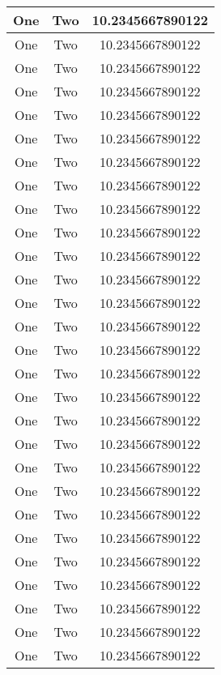 \begin{longtable}{c|c|c}
One & Two & 10.2345667890122 \\ \hline
One & Two & 10.2345667890122 \\ \hline
One & Two & 10.2345667890122 \\ \hline
One & Two & 10.2345667890122 \\ \hline
One & Two & 10.2345667890122 \\ \hline
One & Two & 10.2345667890122 \\ \hline
One & Two & 10.2345667890122 \\ \hline
One & Two & 10.2345667890122 \\ \hline
One & Two & 10.2345667890122 \\ \hline
One & Two & 10.2345667890122 \\ \hline
One & Two & 10.2345667890122 \\ \hline
One & Two & 10.2345667890122 \\ \hline
One & Two & 10.2345667890122 \\ \hline
One & Two & 10.2345667890122 \\ \hline
One & Two & 10.2345667890122 \\ \hline
One & Two & 10.2345667890122 \\ \hline
One & Two & 10.2345667890122 \\ \hline
One & Two & 10.2345667890122 \\ \hline
One & Two & 10.2345667890122 \\ \hline
One & Two & 10.2345667890122 \\ \hline
One & Two & 10.2345667890122 \\ \hline
One & Two & 10.2345667890122 \\ \hline
One & Two & 10.2345667890122 \\ \hline
One & Two & 10.2345667890122 \\ \hline
One & Two & 10.2345667890122 \\ \hline
One & Two & 10.2345667890122 \\ \hline
One & Two & 10.2345667890122 \\ \hline
One & Two & 10.2345667890122 \\
\end{longtable}

\lipsum[1]

